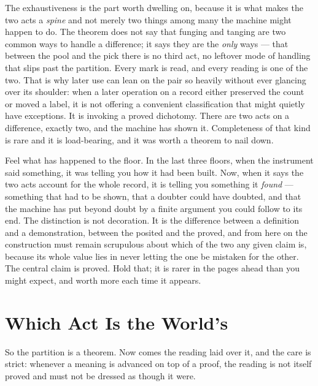 The exhaustiveness is the part worth dwelling on, because it is what makes the two acts a \emph{spine} and not
merely two things among many the machine might happen to do. The theorem does not say that funging and tanging
are two common ways to handle a difference; it says they are the \emph{only} ways --- that between the pool and
the pick there is no third act, no leftover mode of handling that slips past the partition. Every mark is read,
and every reading is one of the two. That is why later use can lean on the pair so heavily without ever glancing
over its shoulder: when a later operation on a record either preserved the count or moved a label, it is not
offering a convenient classification that might quietly have exceptions. It is
invoking a proved dichotomy. There are two acts on a difference, exactly two, and the machine has shown it.
Completeness of that kind is rare and it is load-bearing, and it was worth a theorem to nail down.

Feel what has happened to the floor. In the last three floors, when the instrument said something, it was
telling you how it had been built. Now, when it says the two acts account for the whole record, it is telling you
something it \emph{found} --- something that had to be shown, that a doubter could have doubted, and that the
machine has put beyond doubt by a finite argument you could follow to its end. The distinction is not decoration.
It is the difference between a definition and a demonstration, between the posited and the proved, and from here
on the construction must remain scrupulous about which of the two any given claim is, because its whole value
lies in never letting the one be mistaken for the other. The central claim is proved. Hold that; it is rarer in
the pages ahead than you might expect, and worth more each time it appears.

\section{Which Act Is the World's}

So the partition is a theorem. Now comes the reading laid over it, and the care is strict: whenever a meaning is
advanced on top of a proof, the reading is not itself proved and must not be dressed as though it were.


